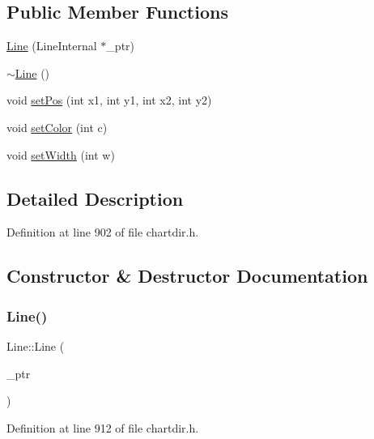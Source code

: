 \subsection*{Public Member Functions}
\begin{DoxyCompactItemize}
\item 
\hyperlink{class_line_ad8f18e042600a682df87983d2ba8d077}{Line} (Line\+Internal $\ast$\+\_\+ptr)
\item 
\hyperlink{class_line_aabe85f48d22d92b62257091f48174fac}{$\sim$\+Line} ()
\item 
void \hyperlink{class_line_ad0534be1075fb29d13c0faa823c91e7f}{set\+Pos} (int x1, int y1, int x2, int y2)
\item 
void \hyperlink{class_line_ab542d562a46e4e64ba4e7d79e3d29c51}{set\+Color} (int c)
\item 
void \hyperlink{class_line_ae764d60af26e544275df26071ae9fbef}{set\+Width} (int w)
\end{DoxyCompactItemize}


\subsection{Detailed Description}


Definition at line 902 of file chartdir.\+h.



\subsection{Constructor \& Destructor Documentation}
\mbox{\label{class_line_ad8f18e042600a682df87983d2ba8d077}} 
\subsubsection{\texorpdfstring{Line()}{Line()}}
{\footnotesize\ttfamily Line\+::\+Line (\begin{DoxyParamCaption}\item[{Line\+Internal $\ast$}]{\+\_\+ptr }\end{DoxyParamCaption})\hspace{0.3cm}{\ttfamily [inline]}}



Definition at line 912 of file chartdir.\+h.

\mbox{\label{class_line_aabe85f48d22d92b62257091f48174fac}} 
